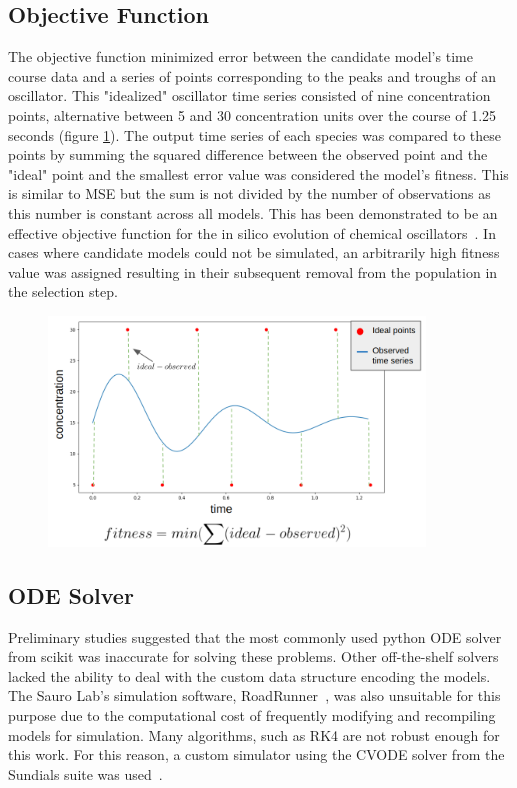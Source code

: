 \documentclass[12pt]{report}
\begin{document}
\subsection{Objective Function}

The objective function minimized error between the candidate model's time course data and a series of points corresponding to the peaks and troughs of an oscillator. This "idealized" oscillator time series consisted of nine concentration points, alternative between 5 and 30 concentration units over the course of 1.25 seconds (figure \ref{fig:fitness}). The output time series of each species was compared to these points by summing the squared difference between the observed point and the "ideal" point and the smallest error value was considered the model's fitness. This is similar to MSE but the sum is not divided by the number of observations as this number is constant across all models. This has been demonstrated to be an effective objective function for the in silico evolution of chemical oscillators~\cite{Paladugu2006}.  In cases where candidate models could not be simulated, an arbitrarily high fitness value was assigned resulting in their subsequent removal from the population in the selection step.  

\begin{figure}
    \centering
    \includegraphics[width=10cm]{images/fitness.png}
    \label{fig:fitness}
\end{figure}

\subsection{ODE Solver}
Preliminary studies suggested that the most commonly used python ODE solver from scikit was inaccurate for solving these problems. Other off-the-shelf solvers lacked the ability to deal with the custom data structure encoding the models. The Sauro Lab's simulation software, RoadRunner~\cite{Somogyi2015}, was also unsuitable for this purpose due to the computational cost of frequently modifying and recompiling models for simulation. Many algorithms, such as RK4 are not robust enough for this work. For this reason, a custom simulator using the CVODE solver from the Sundials suite was used~\cite{hindmarsh2005sundials}. 
\end{document}
